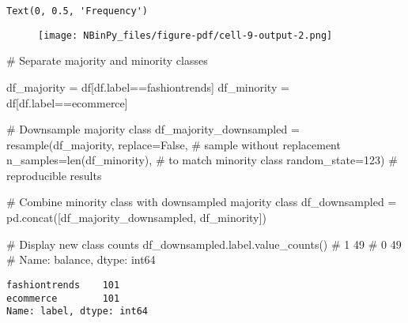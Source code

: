 \documentclass[
  letterpaper,
  DIV=11,
  numbers=noendperiod]{scrartcl}
\newenvironment{Shaded}{\begin{snugshade}}{\end{snugshade}}
\newcommand{\BuiltInTok}[1]{\textcolor[rgb]{0.00,0.23,0.31}{#1}}
\newcommand{\CommentTok}[1]{\textcolor[rgb]{0.37,0.37,0.37}{#1}}
\newcommand{\DecValTok}[1]{\textcolor[rgb]{0.68,0.00,0.00}{#1}}
\newcommand{\NormalTok}[1]{\textcolor[rgb]{0.00,0.23,0.31}{#1}}
\newcommand{\OperatorTok}[1]{\textcolor[rgb]{0.37,0.37,0.37}{#1}}
\newcommand{\StringTok}[1]{\textcolor[rgb]{0.13,0.47,0.30}{#1}}
\newcommand{\VariableTok}[1]{\textcolor[rgb]{0.07,0.07,0.07}{#1}}
\begin{document}
\begin{verbatim}
Text(0, 0.5, 'Frequency')
\end{verbatim}

\begin{figure}[H]

{\centering \texttt{[image: NBinPy\_files/figure-pdf/cell-9-output-2.png]}

}

\end{figure}

\begin{Shaded}
\begin{Highlighting}[]
\CommentTok{\# Separate majority and minority classes}

\NormalTok{df\_majority }\OperatorTok{=}\NormalTok{ df[df.label}\OperatorTok{==}\StringTok{\textquotesingle{}fashiontrends\textquotesingle{}}\NormalTok{]}
\NormalTok{df\_minority }\OperatorTok{=}\NormalTok{ df[df.label}\OperatorTok{==}\StringTok{\textquotesingle{}ecommerce\textquotesingle{}}\NormalTok{]}
\end{Highlighting}
\end{Shaded}

\begin{Shaded}
\begin{Highlighting}[]
\CommentTok{\# Downsample majority class}
\NormalTok{df\_majority\_downsampled }\OperatorTok{=}\NormalTok{ resample(df\_majority, }
\NormalTok{                                 replace}\OperatorTok{=}\VariableTok{False}\NormalTok{,    }\CommentTok{\# sample without replacement}
\NormalTok{                                 n\_samples}\OperatorTok{=}\BuiltInTok{len}\NormalTok{(df\_minority),     }\CommentTok{\# to match minority class}
\NormalTok{                                 random\_state}\OperatorTok{=}\DecValTok{123}\NormalTok{) }\CommentTok{\# reproducible results}
 
\CommentTok{\# Combine minority class with downsampled majority class}
\NormalTok{df\_downsampled }\OperatorTok{=}\NormalTok{ pd.concat([df\_majority\_downsampled, df\_minority])}
 
\CommentTok{\# Display new class counts}
\NormalTok{df\_downsampled.label.value\_counts()}
\CommentTok{\# 1    49}
\CommentTok{\# 0    49}
\CommentTok{\# Name: balance, dtype: int64}
\end{Highlighting}
\end{Shaded}

\begin{verbatim}
fashiontrends    101
ecommerce        101
Name: label, dtype: int64
\end{verbatim}
\end{document}
